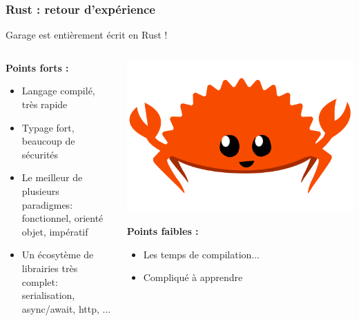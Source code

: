 \documentclass[aspectratio=169]{beamer}
\begin{document}
\begin{frame}
	\frametitle{Rust : retour d'expérience}

	Garage est entièrement écrit en Rust !

	\begin{columns}
	\begin{column}{0.5\textwidth}
		\vspace{2em}

		\textbf{Points forts :}
		\vspace{.5em}
		\begin{itemize}
			\item Langage compilé, très rapide
				\vspace{.5em}
			\item Typage fort, beaucoup de sécurités
				\vspace{.5em}
			\item Le meilleur de plusieurs paradigmes:
				fonctionnel, orienté objet, impératif
				\vspace{.5em}
			\item Un écosytème de librairies très complet:
				serialisation, async/await, http, ...
				\vspace{.5em}
		\end{itemize}

	\end{column}
	
	\begin{column}{0.5\textwidth}
		\begin{centering}
		\includegraphics[width=0.55\columnwidth]{img/rustacean-flat-happy.png}
		\end{centering}

		\vspace{1em}
		\textbf{Points faibles :}
		\vspace{.5em}
		\begin{itemize}
			\item Les temps de compilation...
				\vspace{.5em}
			\item Compliqué à apprendre
		\end{itemize}
	\end{column}
	\end{columns}

\end{frame}
\end{document}
